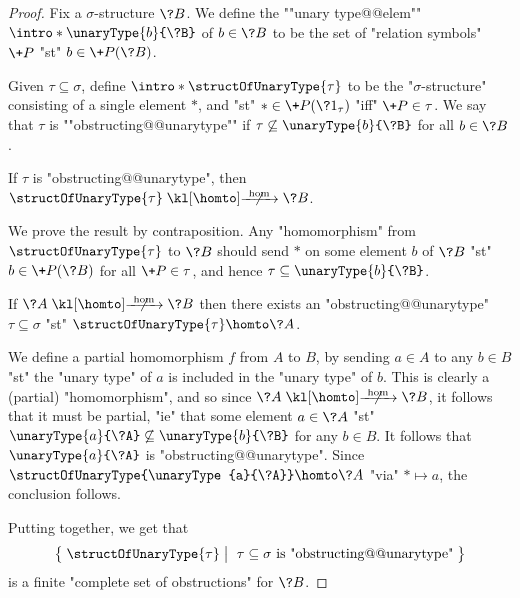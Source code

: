 \begin{proof}
	Fix a $\sigma$-structure $\?B$. We define the \AP""unary type@@elem""
	$\intro*\unaryType{b}{\?B}$ of $b \in \?B$
	to be the set of "relation symbols" $\+P$ "st" $b \in \+P(\?B)$.
	
	Given $\tau \subseteq \sigma$, define \AP$\intro*\structOfUnaryType{\tau}$
	to be the "$\sigma$-structure"
	consisting of a single element $*$, and "st" $* \in \+P(\?1_\tau)$ "iff"
	$\+P \in \tau$.
	We say that $\tau$ is \AP""obstructing@@unarytype"" if
	$\tau \not\subseteq \unaryType{b}{\?B}$ for all $b \in \?B$.

	\begin{claim}
		\AP\label{claim:finite-duality-unary-predicates-direct}
		If $\tau$ is "obstructing@@unarytype",
		then $\structOfUnaryType{\tau} \nothomto \?B$.
	\end{claim}
	We prove the result by contraposition.
	Any "homomorphism" from $\structOfUnaryType{\tau}$ to $\?B$
	should send $*$ on some element $b$ of $\?B$
	"st" $b \in \+P(\?B)$ for all $\+P \in \tau$, and
	hence $\tau \subseteq \unaryType{b}{\?B}$.

	\begin{claim}
		\AP\label{claim:finite-duality-unary-predicates-converse}
		If $\?A \nothomto \?B$ then there exists an "obstructing@@unarytype"
		$\tau \subseteq \sigma$ "st" $\structOfUnaryType{\tau} \homto \?A$.
	\end{claim}
	We define a partial homomorphism $f$ from $A$ to $B$,
	by sending $a \in A$ to any $b \in B$ "st" the "unary type" of $a$
	is included in the "unary type" of $b$. This is clearly a (partial) "homomorphism",
	and so since $\?A \nothomto \?B$, it follows that it must be partial,
	"ie" that some element $a \in \?A$ "st" $\unaryType{a}{\?A} \not\subseteq
	\unaryType{b}{\?B}$ for any $b \in B$. It follows that $\unaryType{a}{\?A}$
	is "obstructing@@unarytype". Since $\structOfUnaryType{\unaryType{a}{\?A}} \homto \?A$
	"via" $* \mapsto a$, the conclusion follows.

	Putting  together, we get that
	\[
		\big\{\;
			\structOfUnaryType{\tau}
			\;\big\vert\;
			\text{ $\tau \subseteq \sigma$ is "obstructing@@unarytype"} 
		\;\big\}
	\]
	is a finite "complete set of obstructions" for $\?B$.
\end{proof}

